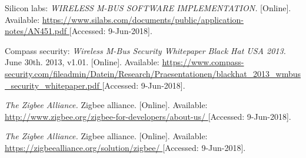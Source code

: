 \begin{thebibliography}{9}

Silicon labs: 
\textit{
WIRELESS M-BUS SOFTWARE IMPLEMENTATION.
}
[Online]. Available:
\url{
https://www.silabs.com/documents/public/application-notes/AN451.pdf
}
[Accessed: 9-Jun-2018].


Compass security:
\textit{
Wireless M-Bus Security Whitepaper Black Hat USA 2013.
}
June 30th. 2013, v1.01.
[Online]. Available:
\url{
https://www.compass-security.com/fileadmin/Datein/Research/Praesentationen/blackhat_2013_wmbus_security_whitepaper.pdf
}
[Accessed: 9-Jun-2018].












\textit{
The Zigbee Alliance.
}
Zigbee alliance.
[Online]. Available:
\url{
http://www.zigbee.org/zigbee-for-developers/about-us/
}
[Accessed: 9-Jun-2018].



\textit{
The Zigbee Alliance.
}
Zigbee alliance.
[Online]. Available:
\url{
https://zigbeealliance.org/solution/zigbee/
}
[Accessed: 9-Jun-2018].






\end{thebibliography}
